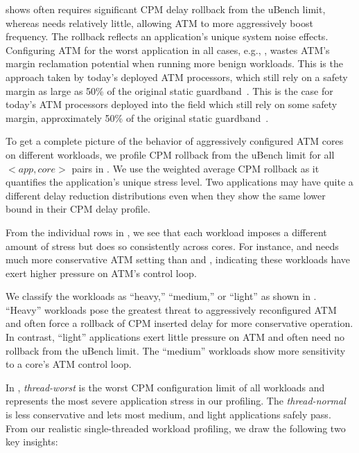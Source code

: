  shows  often requires significant CPM delay rollback from the uBench limit, whereas  needs relatively little, allowing ATM to more aggressively boost frequency. The rollback reflects an application's unique system noise effects. Configuring ATM for the worst application in all cases, e.g., , wastes ATM's margin reclamation potential when running more benign workloads. This is the approach taken by today's deployed ATM processors, which still rely on a safety margin as large as 50\% of the original static guardband~\cite{lefurgy2011active}. This is the case for today's ATM processors deployed into the field which still rely on some safety margin, approximately 50\% of the original static guardband~\cite{lefurgy2011active}.

To get a complete picture of the behavior of aggressively configured ATM cores on different workloads, we profile CPM rollback from the uBench limit for all $<app, core>$ pairs in . We use the weighted average CPM rollback as it quantifies the application's unique stress level. Two applications may have quite a different delay reduction distributions even when they show the same lower bound in their CPM delay profile. 

From the individual rows in , we see that each workload imposes a different amount of stress but does so consistently across cores. For instance,  and  needs much more conservative ATM setting than  and , indicating these workloads have exert higher pressure on ATM's control loop.

We classify the workloads as ``heavy,'' ``medium,'' or ``light'' as shown in . ``Heavy'' workloads pose the greatest threat to aggressively reconfigured ATM and often force a rollback of CPM inserted delay for more conservative operation. In contrast, ``light'' applications exert little pressure on ATM and often need no rollback from the uBench limit. The ``medium'' workloads show more sensitivity to a core's ATM control loop.

In , \textit{thread-worst} is the worst CPM configuration limit of all workloads and represents the most severe application stress in our profiling. The \textit{thread-normal} is less conservative and lets most medium, and light applications safely pass. From our realistic single-threaded workload profiling, we draw the following two key insights:

